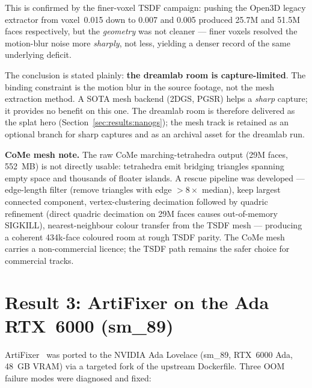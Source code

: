 This is confirmed by the finer-voxel TSDF campaign: pushing the Open3D legacy extractor
from voxel~0.015 down to 0.007 and 0.005 produced 25.7M and 51.5M faces respectively,
but the \emph{geometry} was not cleaner --- finer voxels resolved the motion-blur noise
more \emph{sharply}, not less, yielding a denser record of the same underlying deficit.

The conclusion is stated plainly: \textbf{the dreamlab room is capture-limited}.
The binding constraint is the motion blur in the source footage, not the mesh extraction
method.  A SOTA mesh backend (2DGS, PGSR) helps a \emph{sharp} capture; it provides no
benefit on this one.  The dreamlab room is therefore delivered as the splat hero
(Section~\ref{sec:results:nanogs}); the mesh track is retained as an optional branch for
sharp captures and as an archival asset for the dreamlab run.

\textbf{CoMe mesh note.} The raw CoMe marching-tetrahedra output (29M faces, 552~MB) is
not directly usable: tetrahedra emit bridging triangles spanning empty space and thousands
of floater islands.  A rescue pipeline was developed --- edge-length filter (remove triangles
with edge $>8\times$ median), keep largest connected component, vertex-clustering
decimation followed by quadric refinement (direct quadric decimation on 29M faces causes
out-of-memory SIGKILL), nearest-neighbour colour transfer from the TSDF mesh --- producing
a coherent 434k-face coloured room at rough TSDF parity.  The CoMe mesh carries a
non-commercial licence; the TSDF path remains the safer choice for commercial tracks.

\section{Result 3: ArtiFixer on the Ada RTX~6000 (sm\_89)}
\label{sec:results:artifixer}

ArtiFixer~\cite{delutio2026_artifixer} was ported to the NVIDIA Ada Lovelace (sm\_89, RTX~6000
Ada, 48~GB VRAM) via a targeted fork of the upstream Dockerfile.  Three OOM failure modes
were diagnosed and fixed:

